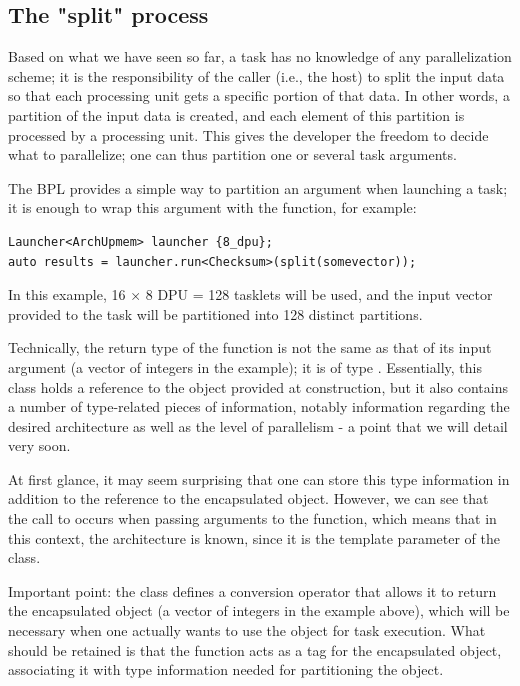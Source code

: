 \subsection{The "split" process}

Based on what we have seen so far, a task has no knowledge of any parallelization scheme; it is the responsibility of the caller (i.e., the host) 
to split the input data so that each processing unit gets a specific portion of that data.  In other words, a partition of the input data is created, and each element of this partition is processed by a processing unit.  This gives the developer the freedom to decide what to parallelize; one can thus partition one or several task arguments.

The BPL provides a simple way to partition an argument when launching a task; it is enough to wrap this argument with the  function, for example:

\begin{verbatim}
Launcher<ArchUpmem> launcher {8_dpu};
auto results = launcher.run<Checksum>(split(somevector));
\end{verbatim}

In this example, 16 × 8 DPU = 128 tasklets will be used, and the input vector provided to the task will be partitioned into 128 distinct partitions.

Technically, the return type of the  function is not the same as that of its input argument (a vector of integers in the example); it is of type . Essentially, this class holds a reference to the object provided at construction, but it also contains a number of  type-related pieces of information, notably information regarding the desired architecture as well as the level of  parallelism - a point that we will detail very soon.

At first glance, it may seem surprising that one can store this type information in addition to the reference to the encapsulated object. However, we can see that the call to  occurs when passing arguments to the   function, which means that in this context, the architecture is known,  since it is the template parameter of the  class.

Important point: the  class defines a conversion operator that allows it to return the encapsulated object (a vector of integers in the example above),  which will be necessary when one actually wants to use the object for task execution.  What should be retained is that the  function acts as a tag for the encapsulated object,  associating it with type information needed for partitioning the object.

